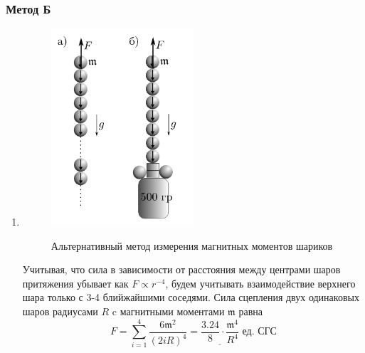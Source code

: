 \documentclass[11pt,a4paper]{article}
\newcommand{\mk}{\mathfrak}
\begin{document}
\subsubsection{Метод Б}
\begin{enumerate}
  \item \begin{figure}[H]
    \includegraphics*[width=0.5\textwidth]{2023-10-02-00-43-23.png}
    \label{ust:met_b}
    \caption{Альтернативный ме­тод измерения магнитных
    моментов шариков}
  \end{figure}
  Учитывая, что
  сила в зависимости от расстояния между центрами шаров притяжения убывает как $F\varpropto r^{-4}$, будем учитывать взаимодействие верхнего шара только с 3-4 блийжайшими соседями. Сила сцепления двух одинаковых шаров радиусами $R$ c магнитными моментами $\mathfrak{m}$ равна $$F = \sum_{i=1}^{4} \frac{6\mk m^2}{(2iR)^4} = \underline{\frac{3.24}{8}\cdot\frac{\mathfrak{m}^4}{R^4}}\text{ ед. СГС}$$
\end{enumerate}
\end{document}
